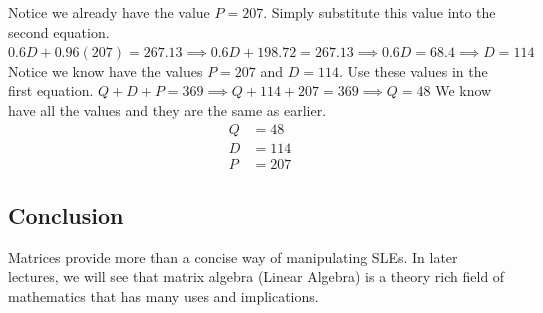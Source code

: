Notice we already have the value $P=207$.  Simply substitute this value into the second equation.
$0.6D + 0.96(207) = 267.13 \implies 0.6D + 198.72 = 267.13 \implies 0.6D = 68.4 \implies D = 114$
Notice we know have the values $P=207$ and $D=114$.  Use these values in the first equation.
$Q+D+P = 369 \implies Q + 114 + 207 = 369 \implies Q = 48$
We know have all the values and they are the same as earlier.
\begin{align*}
    Q &= 48 \\
    D &= 114 \\
    P &= 207
\end{align*}

\subsection*{Conclusion}
Matrices provide more than a concise way of manipulating SLEs.  In later lectures, we will see that matrix algebra (Linear Algebra) is a theory rich field of mathematics that has many uses and implications.